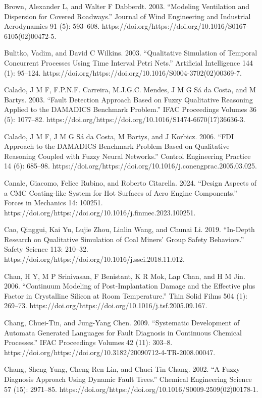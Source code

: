 \documentclass[utf8]{gradu3}
\begin{document}
Brown, Alexander L, and Walter F Dabberdt. 2003. “Modeling Ventilation and Dispersion for Covered Roadways.” Journal of Wind Engineering and Industrial Aerodynamics 91 (5): 593–608. https://doi.org/https://doi.org/10.1016/S0167-6105(02)00472-5.

Bulitko, Vadim, and David C Wilkins. 2003. “Qualitative Simulation of Temporal Concurrent Processes Using Time Interval Petri Nets.” Artificial Intelligence 144 (1): 95–124. https://doi.org/https://doi.org/10.1016/S0004-3702(02)00369-7.

Calado, J M F, F.P.N.F. Carreira, M.J.G.C. Mendes, J M G Sá da Costa, and M Bartys. 2003. “Fault Detection Approach Based on Fuzzy Qualitative Reasoning Applied to the DAMADICS Benchmark Problem.” IFAC Proceedings Volumes 36 (5): 1077–82. https://doi.org/https://doi.org/10.1016/S1474-6670(17)36636-3.

Calado, J M F, J M G Sá da Costa, M Bartys, and J Korbicz. 2006. “FDI Approach to the DAMADICS Benchmark Problem Based on Qualitative Reasoning Coupled with Fuzzy Neural Networks.” Control Engineering Practice 14 (6): 685–98. https://doi.org/https://doi.org/10.1016/j.conengprac.2005.03.025.

Canale, Giacomo, Felice Rubino, and Roberto Citarella. 2024. “Design Aspects of a CMC Coating-like System for Hot Surfaces of Aero Engine Components.” Forces in Mechanics 14: 100251. https://doi.org/https://doi.org/10.1016/j.finmec.2023.100251.

Cao, Qinggui, Kai Yu, Lujie Zhou, Linlin Wang, and Chunai Li. 2019. “In-Depth Research on Qualitative Simulation of Coal Miners’ Group Safety Behaviors.” Safety Science 113: 210–32. https://doi.org/https://doi.org/10.1016/j.ssci.2018.11.012.

Chan, H Y, M P Srinivasan, F Benistant, K R Mok, Lap Chan, and H M Jin. 2006. “Continuum Modeling of Post-Implantation Damage and the Effective plus Factor in Crystalline Silicon at Room Temperature.” Thin Solid Films 504 (1): 269–73. https://doi.org/https://doi.org/10.1016/j.tsf.2005.09.167.

Chang, Chuei-Tin, and Jung-Yang Chen. 2009. “Systematic Development of Automata Generated Languages for Fault Diagnosis in Continuous Chemical Processes.” IFAC Proceedings Volumes 42 (11): 303–8. https://doi.org/https://doi.org/10.3182/20090712-4-TR-2008.00047.

Chang, Sheng-Yung, Cheng-Ren Lin, and Chuei-Tin Chang. 2002. “A Fuzzy Diagnosis Approach Using Dynamic Fault Trees.” Chemical Engineering Science 57 (15): 2971–85. https://doi.org/https://doi.org/10.1016/S0009-2509(02)00178-1.
\end{document}
